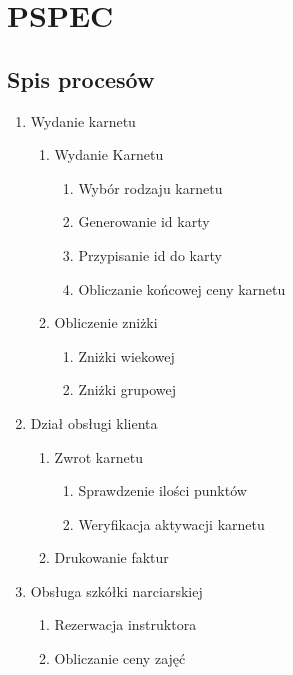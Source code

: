 \newpage
\section{PSPEC}
\begin{multicols}{2}
\subsection{Spis procesów}

\begin{enumerate}
	\item Wydanie karnetu
    	\begin{enumerate}
        	\item Wydanie Karnetu
            	\begin{enumerate}
                	\item Wybór rodzaju karnetu
                    \item Generowanie id karty
                    \item Przypisanie id do karty
                    \item Obliczanie końcowej ceny karnetu
                \end{enumerate}
            \item Obliczenie zniżki
            	\begin{enumerate}
                	\item Zniżki wiekowej
                    \item Zniżki grupowej
                \end{enumerate}
        \end{enumerate}
    \item Dział obsługi klienta
    	\begin{enumerate}
        	\item Zwrot karnetu
            	\begin{enumerate}
                	\item Sprawdzenie ilości punktów
                    \item Weryfikacja aktywacji karnetu
                \end{enumerate}
            \item Drukowanie faktur
        \end{enumerate}
    \item Obsługa szkółki narciarskiej
    	\begin{enumerate}
        	\item Rezerwacja instruktora
            \item Obliczanie ceny zajęć

\end{enumerate}
\end{enumerate}
\end{multicols}
